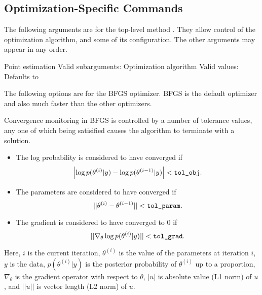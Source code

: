 \subsection{Optimization-Specific Commands}

The following arguments are for the top-level method .
They allow control of the optimization algorithm, and some of its
configuration.  The other arguments may appear in any order.

\begin{description}
%
    {Point estimation}
    {Valid subarguments: }
%
      {Optimization algorithm}
      {Valid values: \  }
      {Defaults to }
\end{description}
%
The following options are for the BFGS optimizer.  BFGS is the default
optimizer and also much faster than the other optimizers.  

Convergence monitoring in BFGS is controlled by a number of tolerance
values, any one of which being satisified causes the algorithm to
terminate with a solution.
%
\begin{itemize}
\item The log probability is considered to have converged if
\[
\left| \log p(\theta^{(i)}|y) - \log p(\theta^{(i-1)}|y) \right| <
\mbox{\code{tol\_obj}}.
\]
\item The parameters are considered to have converged if
%
\\
\[
|| \theta^{(i)} - \theta^{(i-1)} || < \mbox{\code{tol\_param}}.
\]
%
\item The gradient is considered to have converged to 0 if 
\[
|| \nabla_{\theta} \log p(\theta^{(i)}|y) || < \mbox{\code{tol\_grad}}.
\]
\end{itemize}
%
Here, $i$ is the current iteration, $\theta^{(i)}$ is the value of the
parameters at iteration $i$, $y$ is the data, $p(\theta^{(i)}|y)$ is
the posterior probability of $\theta^{(i)}$ up to a proportion,
$\nabla_{\theta}$ is the gradient operator with respect to $\theta$,
$|u|$ is absolute value (L1 norm) of $u$, and $||u||$ is vector length
(L2 norm) of $u$.

